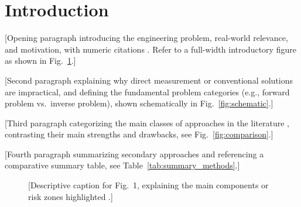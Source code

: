 \documentclass[final,5p,times,twocolumn]{elsarticle}
\begin{document}

\setcounter{tocdepth}{2} %
\tableofcontents
\vspace{1em}

\section{Introduction}\label{sec:intro}

[Opening paragraph introducing the engineering problem, real-world relevance, and motivation, with numeric citations \cite{ref1,ref2}. Refer to a full-width introductory figure as shown in Fig.~\ref{fig:overview}.]

[Second paragraph explaining why direct measurement or conventional solutions are impractical, and defining the fundamental problem categories (e.g., forward problem vs.\ inverse problem), shown schematically in Fig.~\ref{fig:schematic}.]

[Third paragraph categorizing the main classes of approaches in the literature \cite{ref1,ref2,ref3}, contrasting their main strengths and drawbacks, see Fig.~\ref{fig:comparison}.]

[Fourth paragraph summarizing secondary approaches and referencing a comparative summary table, see Table~\ref{tab:summary_methods}.]

\begin{figure}[t]
    \centering
    \caption{[Descriptive caption for Fig.~1, explaining the main components or risk zones highlighted \cite{ref3}.]}
    \label{fig:overview}
\end{figure}
\end{document}
